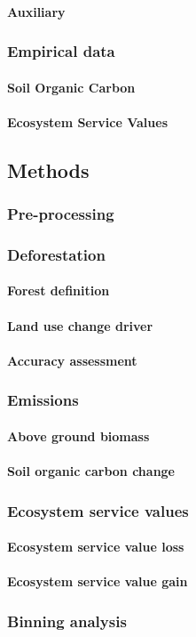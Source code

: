 		\paragraph{Auxiliary}

	\subsubsection{Empirical data}
		\paragraph{Soil Organic Carbon}
		\paragraph{Ecosystem Service Values}


\subsection{Methods}
\label{subsec:methods}

	\subsubsection{Pre-processing}

	\subsubsection{Deforestation}
		\paragraph{Forest definition}
		\paragraph{Land use change driver}
		\paragraph{Accuracy assessment}

	\subsubsection{Emissions}
		\paragraph{Above ground biomass}
		\paragraph{Soil organic carbon change}

	\subsubsection{Ecosystem service values}
		\paragraph{Ecosystem service value loss}
		\paragraph{Ecosystem service value gain}

	\subsubsection{Binning analysis}